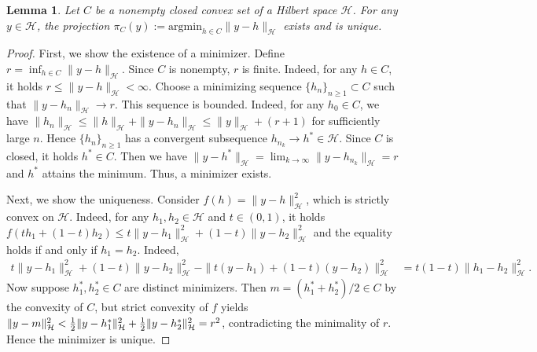 \documentclass[11pt,reqno]{amsart}
\newtheorem{lemma}{Lemma}
\begin{document}
\begin{lemma}\label{lem:A1}
Let $C$ be a nonempty closed convex set of a Hilbert space $\mathcal{H}$. For any $y \in \mathcal{H}$, the projection $\pi_C(y) := \mathrm{argmin}_{h \in C} \|y-h\|_\mathcal{H}$ exists and is unique.
\end{lemma}

\begin{proof} 
First, we show the existence of a minimizer. Define $r = \inf_{h \in C} \|y-h\|_\mathcal{H}$. Since $C$ is nonempty, $r$ is finite. Indeed, for any $h \in C$, it holds $r \leq \|y-h\|_\mathcal{H} <\infty$. Choose a minimizing sequence $\{h_n\}_{n \geq 1} \subset C$ such that $\|y-h_n\|_\mathcal{H} \to r$. This sequence is bounded. Indeed, for any $h_0 \in C$, we have $\|h_n\|_\mathcal{H} \leq \|h\|_\mathcal{H} + \|y-h_n\|_\mathcal{H} \leq \|y\|_\mathcal{H} + (r+1)$ for sufficiently large $n$. Hence $\{h_n\}_{n \geq 1}$ has a convergent subsequence $h_{n_k} \to h^\ast \in \mathcal{H}$. Since $C$ is closed, it holds $h^\ast \in C$. Then we have $\|y-h^*\|_\mathcal{H} = \lim_{k\to\infty}\|y-h_{n_k}\|_\mathcal{H} = r$ and $h^*$ attains the minimum. Thus, a minimizer exists.

Next, we show the uniqueness. Consider $f(h) = \|y-h\|_\mathcal{H}^2$, which is strictly convex on $\mathcal{H}$. Indeed, for any $h_1, h_2 \in \mathcal{H}$ and $t \in (0,1)$, it holds $f(th_1+(1-t)h_2) %
\leq t\|y-h_1\|_\mathcal{H}^2 + (1-t)\|y-h_2\|_\mathcal{H}^2$ and the equality holds if and only if $h_1 = h_2$. Indeed,
\begin{align*}
t\|y-h_1\|_\mathcal{H}^2 + (1-t)\|y-h_2\|_\mathcal{H}^2 - \|t(y-h_1)+(1-t)(y-h_2)\|_\mathcal{H}^2 
&= t(1-t)\|h_1-h_2\|_\mathcal{H}^2. 
\end{align*} 
Now suppose $h_1^\ast, h_2^\ast \in C$ are distinct minimizers. Then  $m=(h_1^\ast+h_2^\ast)/2 \in C$ by the convexity of $C$, but strict convexity of $f$ yields $\|y-m\|_\mathcal{H}^2 < {1 \over 2} \|y-h_1^\ast\|_\mathcal{H}^2 + {1 \over 2} \|y-h_2^\ast\|_\mathcal{H}^2 = r^2$, contradicting the minimality of $r$. Hence the minimizer is unique.
\end{proof}
\end{document}
